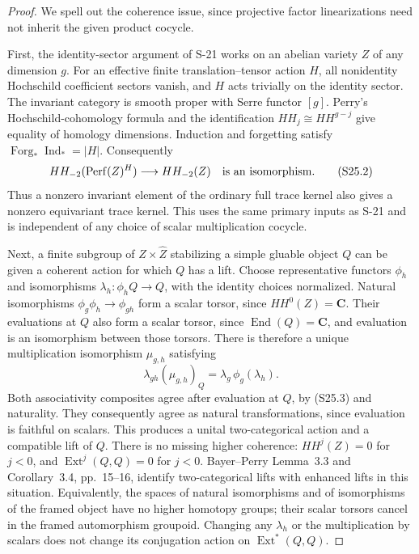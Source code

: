 \documentclass[11pt,a4paper]{article}
\theoremstyle{definition}
\begin{document}
\begin{proof}
We spell out the coherence issue, since projective factor
linearizations need not inherit the given product cocycle.

First, the identity-sector argument of S-21 works on an
abelian variety $Z$ of any dimension $g$. For an effective
finite translation--tensor action $H$, all nonidentity
Hochschild coefficient sectors vanish, and $H$ acts
trivially on the identity sector. The invariant category
is smooth proper with Serre functor $[g]$. Perry's
Hochschild-cohomology formula and the identification
$HH_j\cong HH^{g-j}$ give equality of homology dimensions.
Induction and forgetting satisfy
$\operatorname{Forg}_*\operatorname{Ind}_*=|H|$.
Consequently
\[
 HH_{-2}(\operatorname{Perf}(Z)^H)
   \longrightarrow HH_{-2}(Z)
 \quad\hbox{is an isomorphism}.
 \tag{S25.2}
\]
Thus a nonzero invariant element of the ordinary full
trace kernel also gives a nonzero equivariant trace kernel.
This uses the same primary inputs as S-21 and is
independent of any choice of scalar multiplication cocycle.

Next, a finite subgroup of $Z\times\widehat Z$ stabilizing
a simple gluable object $Q$ can be given a coherent action
for which $Q$ has a lift. Choose representative functors
$\phi_h$ and isomorphisms $\lambda_h:\phi_hQ\to Q$,
with the identity choices normalized. Natural isomorphisms
$\phi_g\phi_h\to\phi_{gh}$ form a scalar torsor,
since $HH^0(Z)=\mathbf C$. Their evaluations at $Q$ also
form a scalar torsor, since $\operatorname{End}(Q)=\mathbf C$,
and evaluation is an isomorphism between those torsors.
There is therefore a unique multiplication isomorphism
$\mu_{g,h}$ satisfying
\[
 \lambda_{gh}(\mu_{g,h})_Q
       =\lambda_g\,\phi_g(\lambda_h).
 \tag{S25.3}
\]
Both associativity composites agree after evaluation at
$Q$, by (S25.3) and naturality. They consequently agree as natural
transformations, since evaluation is faithful on scalars.
This produces a unital two-categorical action and a
compatible lift of $Q$.
There is no missing higher coherence: $HH^j(Z)=0$ for
$j<0$, and $\operatorname{Ext}^j(Q,Q)=0$ for $j<0$.
Bayer--Perry Lemma~3.3 and Corollary~3.4, pp.~15--16,
identify two-categorical lifts with enhanced lifts in
this situation. Equivalently, the spaces of natural
isomorphisms and of isomorphisms of the framed object
have no higher homotopy groups; their scalar torsors
cancel in the framed automorphism groupoid.
Changing any $\lambda_h$ or the multiplication by
scalars does not change its conjugation action on
$\operatorname{Ext}^*(Q,Q)$.


\end{proof}
\end{document}
